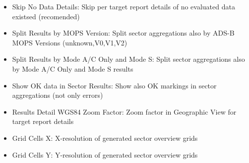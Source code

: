 \begin{itemize}  
\item Skip No Data Details: Skip per target report details of no evaluated data existsed (recomended)
\item Split Results by MOPS Version: Split sector aggregations also by ADS-B MOPS Versions (unknown,V0,V1,V2)
\item Split Results by Mode A/C Only and Mode S: Split sector aggregations also by Mode A/C Only and Mode S results
\item Show OK data in Sector Results: Show also OK markings in sector aggregations (not only errors)
\item Results Detail WGS84 Zoom Factor: Zoom factor in Geographic View for target report details
\item Grid Cells X: X-resolution of generated sector overview grids
\item Grid Cells Y: Y-resolution of generated sector overview grids
\end{itemize}
\ \\








